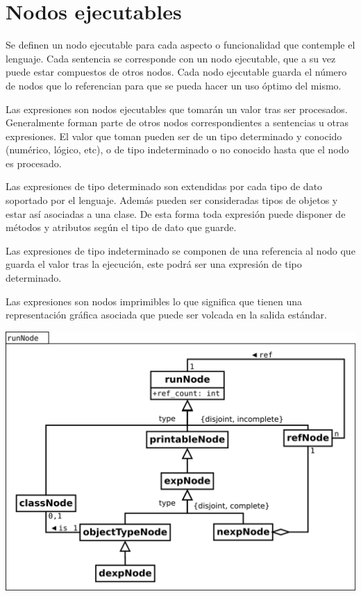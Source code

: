 \section{Nodos ejecutables}
Se definen un nodo ejecutable para cada aspecto o funcionalidad que contemple el lenguaje.
Cada sentencia se corresponde con un nodo ejecutable, que a su vez puede estar compuestos de otros
nodos. Cada nodo ejecutable guarda el número de nodos que lo referencian para que se pueda hacer un uso 
óptimo del mismo.

Las expresiones son nodos ejecutables que tomarán un valor tras ser procesados. Generalmente forman parte de otros 
nodos correspondientes a sentencias u otras expresiones. El valor que toman pueden ser de un tipo determinado y conocido (numérico, lógico, etc), 
o de tipo indeterminado o no conocido hasta que el nodo es procesado. 

Las expresiones de tipo determinado son extendidas por cada tipo de dato soportado por el lenguaje. Además 
pueden ser consideradas tipos de objetos y estar así asociadas a una clase. De esta forma toda expresión puede disponer
de métodos y atributos según el tipo de dato que guarde.

Las expresiones de tipo indeterminado se componen de una referencia al nodo que guarda el valor tras la ejecución, este podrá ser una 
expresión de tipo determinado.

Las expresiones son nodos imprimibles lo que significa que tienen una representación gráfica asociada que puede ser volcada en la
salida estándar.

\begin{center}
\includegraphics[scale=0.4]{runNode.png} \\
\end{center}
\pagebreak
